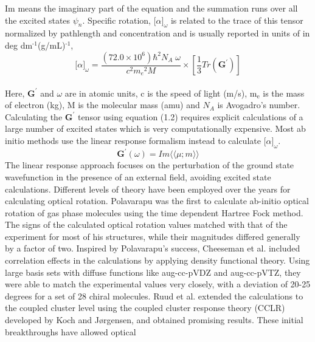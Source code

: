 Im means the imaginary part of the equation and the summation runs over all the excited
states $\psi_n$. Specific rotation, ${\lbrack\alpha\rbrack}_\omega$ is related to the trace of this tensor 
normalized by pathlength and concentration and is usually reported in units of in deg dm$^{\text{-1}}$(g/mL)$^{\text{-1}}$,\cite{Crawford06}
\\
\begin{equation}
{\lbrack\alpha\rbrack}_{\omega} = \frac{(72.0 \times 10^6){\hbar}^2 N_A\;\omega}{c^2{m_e}^2 M} \times \left[ \frac{1}{3}Tr(\textbf{G}^\prime)\right]
\end{equation}
\\
Here, $\textbf{G}^\prime$ and $\omega$ are in atomic units, c is the speed of light (m/s), m$_{\text{e}}$ is the 
mass of electron (kg), M is the molecular mass (amu) and $N_A$ is Avogadro's number. Calculating the 
$\textbf{G}^\prime$ tensor using equation (1.2) requires explicit calculations of a large number of excited states which is very computationally expensive. Most ab initio methods use the linear response formalism
\cite{Koch90,Kobayashi94} instead to calculate ${\lbrack\alpha\rbrack}_\omega$.
\begin{equation}
\textbf{G}^{\prime}(\omega) = Im\langle\langle\mu;m\rangle\rangle
\end{equation} The linear response approach focuses on the perturbation of the
ground state wavefunction in the presence of an external field, avoiding
excited state calculations. Different levels of theory have been employed
over the years for calculating optical rotation. Polavarapu was the first to
calculate ab-initio optical rotation of gas phase molecules using the time
dependent Hartree Fock method\cite{Polavarapu96}. The signs of the calculated optical
rotation values matched with that of the experiment for most of his structures,
while their magnitudes differed generally by a factor of two. Inspired by
Polavarapu's success, Cheeseman et al. \cite{Cheeseman00,Stephens01} included correlation
effects in the calculations by applying density functional theory.
Using large basis sets with diffuse functions like aug-cc-pVDZ and aug-cc-pVTZ,\cite{Dunning89} they were able to match the experimental values very closely, with a deviation of 20-25 degrees
for a set of 28 chiral molecules. Ruud et al. extended the calculations to the
coupled cluster level using the coupled cluster response
theory (CCLR) developed by Koch and J{\o}rgensen\cite{Koch90},
and obtained promising results\cite{Ruud03}. These initial breakthroughs have allowed optical
